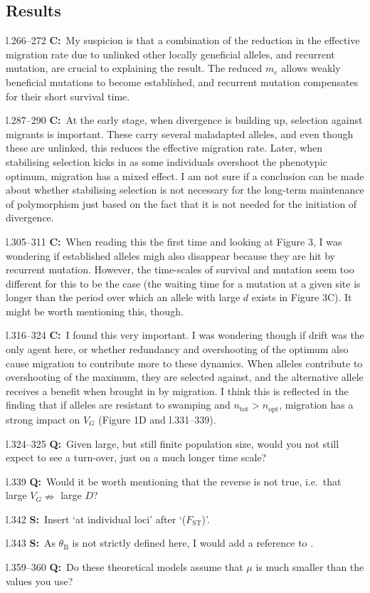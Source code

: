 \documentclass[11pt]{article}
\newenvironment{my_description}
{\begin{description}
  \setlength{\itemsep}{2pt}
  \setlength{\parskip}{0pt}
  \setlength{\parsep}{0pt}}
{\end{description}}
\newcommand{\C}{\textbf{C:}\ }
\newcommand{\Q}{\textbf{Q:}\ }
\newcommand{\V}{\textbf{S:}\ }
\begin{document}
\subsection{Results}
\begin{my_description}
	\item[l.266--272] \C My suspicion is that a combination of the reduction in the effective migration rate due to unlinked other locally geneficial alleles, and recurrent mutation, are crucial to explaining the result. The reduced $m_e$ allows weakly beneficial mutations to become established, and recurrent mutation compensates for their short survival time.
	\item[l.287--290] \C At the early stage, when divergence is building up, selection against migrants is important. These carry several maladapted alleles, and even though these are unlinked, this reduces the effective migration rate. Later, when stabilising selection kicks in as some individuals overshoot the phenotypic optimum, migration has a mixed effect. I am not sure if a conclusion can be made about whether stabilising selection is not necessary for the long-term maintenance of polymorphism just based on the fact that it is not needed for the initiation of divergence.
	\item[l.305--311] \C When reading this the first time and looking at Figure 3, I was wondering if established alleles migh also disappear because they are hit by recurrent mutation. However, the time-scales of survival and mutation seem too different for this to be the case (the waiting time for a mutation at a given site is longer than the period over which an allele with large $d$ exists in Figure 3C). It might be worth mentioning this, though.
	\item[l.316--324] \C I found this very important. I was wondering though if drift was the only agent here, or whether redundancy and overshooting of the optimum also cause migration to contribute more to these dynamics. When alleles contribute to overshooting of the maximum, they are selected against, and the alternative allele receives a benefit when brought in by migration. I think this is reflected in the finding that if alleles are resistant to swamping and $n_{\mathrm{tot}} > n_{\mathrm{opt}}$, migration has a strong impact on $V_G$ (Figure 1D and l.331--339).
	\item[l.324--325] \Q Given large, but still finite population size, would you not still expect to see a turn-over, just on a much longer time scale?
	\item[l.339] \Q Would it be worth mentioning that the reverse is not true, i.e.\ that large $V_G \nRightarrow$ large $D$?
	\item[l.342] \V Insert `at individual loci' after `($F_{\mathrm{ST}}$)'.
	\item[l.343] \V As $\theta_{\mathrm{B}}$ is not strictly defined here, I would add a reference to \cite{Le-Corre:2003ts}.
	\item[l.359--360] \Q Do these theoretical models assume that $\mu$ is much smaller than the values you use?
\end{my_description}
\end{document}
